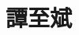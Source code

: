 \documentclass[11pt,a4paper]{moderncv}
\title{譚至斌}
\begin{document}
\begin{CJK}{UTF8}{bsmi}
\maketitle
\end{CJK}



 

\end{document}
